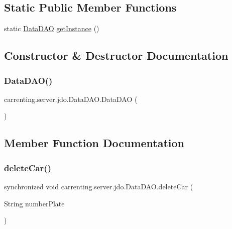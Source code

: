 \subsection*{Static Public Member Functions}
\begin{DoxyCompactItemize}
\item 
static \mbox{\hyperlink{classcarrenting_1_1server_1_1jdo_1_1_data_d_a_o}{Data\+D\+AO}} \mbox{\hyperlink{classcarrenting_1_1server_1_1jdo_1_1_data_d_a_o_af8f8055222b8f4337f5f46c4365078d6}{get\+Instance}} ()
\end{DoxyCompactItemize}


\subsection{Constructor \& Destructor Documentation}
\mbox{\label{classcarrenting_1_1server_1_1jdo_1_1_data_d_a_o_a99112c37c44213ed0f42c0a888c28efc}} 
\subsubsection{\texorpdfstring{DataDAO()}{DataDAO()}}
{\footnotesize\ttfamily carrenting.\+server.\+jdo.\+Data\+D\+A\+O.\+Data\+D\+AO (\begin{DoxyParamCaption}{ }\end{DoxyParamCaption})}



\subsection{Member Function Documentation}
\mbox{\label{classcarrenting_1_1server_1_1jdo_1_1_data_d_a_o_ac28ce30e234f307f395f5a21e3aab17b}} 
\subsubsection{\texorpdfstring{deleteCar()}{deleteCar()}}
{\footnotesize\ttfamily synchronized void carrenting.\+server.\+jdo.\+Data\+D\+A\+O.\+delete\+Car (\begin{DoxyParamCaption}\item[{String}]{number\+Plate }\end{DoxyParamCaption})}

